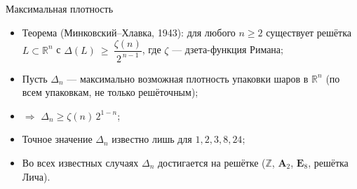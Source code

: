 \documentclass[serif, aspectratio=169]{beamer}
\begin{document}
\begin{frame}{Максимальная плотность}
    \begin{itemize}
        \item Теорема (Минковский--Хлавка, 1943): для любого $n\geqslant2$ существует решётка $L\subset\mathbb{R}^n$ с $\Delta(L)\ \geqslant\ \dfrac{\zeta(n)}{2^{\,n-1}}$, где $\zeta$ --- дзета-функция Римана;
        \item Пусть $\Delta_n$ --- максимально возможная плотность упаковки шаров в $\mathbb{R}^n$ (по всем упаковкам, не только решёточным);
        \item $\Rightarrow$ $\Delta_n\geqslant\zeta(n)\,2^{1-n}$;
        \item Точное значение $\Delta_n$ известно лишь для $1,2,3,8,24$;
        \item Во всех известных случаях $\Delta_n$ достигается на решётке ($\mathbb{Z}$, $\mathbf A_2$, $\mathbf E_8$, решётка Лича).
    \end{itemize}
\end{frame}
\end{document}
